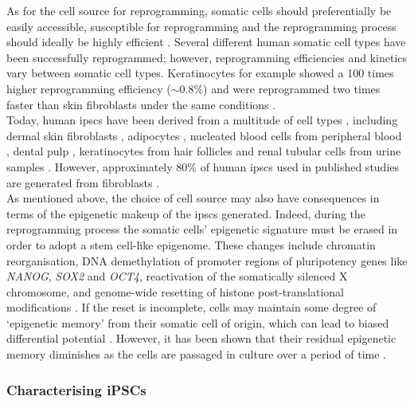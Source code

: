 As for the cell source for reprogramming, somatic cells should preferentially be easily accessible, susceptible for reprogramming and the reprogramming process should ideally be highly efficient \cite{brouwer2016choices}. 
Several different human somatic cell types have been successfully reprogrammed; however, reprogramming efficiencies and kinetics vary between somatic cell types. 
Keratinocytes for example showed a 100 times higher reprogramming efficiency ($\sim$0.8\%) and were reprogrammed two times faster than skin fibroblasts under the same conditions \cite{aasen2008efficient}. \\

Today, human \glspl{ipsc} have been derived from a multitude of cell types \cite{doss2019current}, including dermal skin fibroblasts \cite{takahashi2007induction, yu2007induced}, adipocytes \cite{sugii2010human}, nucleated blood cells from peripheral blood \cite{loh2009generation, seki2010generation}, dental pulp \cite{yan2010ips},
keratinocytes from hair follicles \cite{aasen2008efficient} and
renal tubular cells from urine samples \cite{cao2018generation}.
However, approximately 80\% of human \glspl{ipsc} used in published studies are generated from fibroblasts \cite{takahashi2016decade}. \\

As mentioned above, the choice of cell source may also have consequences in terms of the epigenetic makeup of the \glspl{ipsc} generated.
Indeed, during the reprogramming process the somatic cells' epigenetic signature must be erased in order to adopt a stem cell-like epigenome.
These changes include chromatin reorganisation, DNA demethylation of promoter regions of pluripotency genes like \textit{NANOG}, \textit{SOX2} and \textit{OCT4}, reactivation of the somatically silenced X chromosome, and genome-wide resetting of histone post-translational modifications \cite{takahashi2007induction, maherali2007directly, wernig2007vitro, buganim2013mechanisms}.
If the reset is incomplete, cells may maintain some degree of `epigenetic memory' from their somatic cell of origin, which can lead to biased differential potential \cite{kim2010epigenetic, polo2010cell}.
However, it has been shown that their residual epigenetic memory diminishes as the cells are passaged in culture over a period of time \cite{ghosh2010persistent}.

\subsubsection{Characterising iPSCs}
\label{sec:ipsc_characterise}

